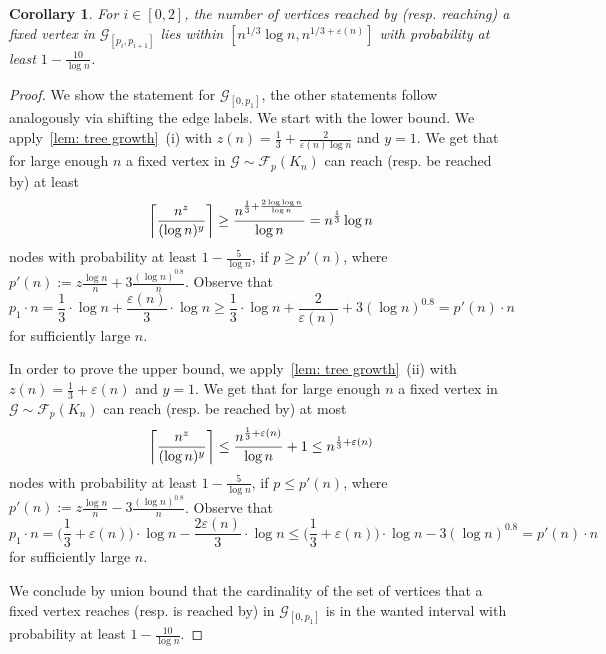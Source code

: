 \documentclass[a4paper,11pt]{article}
\theoremstyle{definition}
\theoremstyle{plain}
\newtheorem{corollary}{Corollary}
\let\eps\varepsilon
\newcommand{\FFF}{\mathcal{F}}
\newcommand{\GGG}{\mathcal{G}}
\DeclarePairedDelimiter\ceil{\lceil}{\rceil}
\begin{document}
\begin{corollary}\label{cor: reach thirds}
  For $i\in [0, 2]$, the number of vertices \emph{reached by} (resp. \emph{reaching}) a fixed vertex in
  $\GGG_{[p_i,p_{i+1}]}$ lies within $[n^{1/3}\log n, n^{1/3 + \eps(n)}]$ with probability at least $1 - \frac{10}{\log n}$.
\end{corollary}
\begin{proof}
		We show the statement for $\GGG_{[0, p_1]}$, the other statements follow analogously via shifting the edge labels.
        We start with the lower bound. We apply~\cref{lem: tree growth}~(i) with $z(n)=\frac{1}{3} + \frac{2}{\eps(n)\log n}$ and $y=1$. We get that for large enough $n$ a fixed vertex in $\GGG\sim\FFF_{p}(K_n)$ can reach (resp. be reached by) at least
        \[
            \ceil*{\frac{n^z}{(\log n)^y}}
						\ge \frac{n^{\frac{1}{3} + \frac{2\log \log n}{\log n}}}{\log n}
            = n^{\frac{1}{3}} \log n
        \]
        nodes with probability at least $1-\frac{5}{\log n}$, if $p\ge p'(n)$, where $p'(n):=z \frac{\log n}{n} + 3 \frac{(\log n)^{0.8}}{n}$. Observe that
        \[
            p_1 \cdot n
            = \frac{1}{3}\cdot \log n + \frac{\eps(n)}{3} \cdot \log n
            \ge \frac{1}{3}\cdot \log n + \frac{2}{\eps(n)} + 3(\log n)^{0.8}
						= p'(n) \cdot n
        \]
				for sufficiently large $n$.

				In order to prove the upper bound, we apply~\cref{lem: tree growth}~(ii) with $z(n)=\frac{1}{3} + \eps(n)$ and $y=1$. We get that for large enough $n$ a fixed vertex in $\GGG\sim\FFF_{p}(K_n)$ can reach (resp. be reached by) at most
        \[
            \ceil*{\frac{n^z}{(\log n)^y}}
						\le \frac{n^{\frac{1}{3} + \eps(n)}}{\log n} + 1
						\le n^{\frac{1}{3} + \eps(n)}
        \]
        nodes with probability at least $1-\frac{5}{\log n}$, if $p\le p'(n)$, where $p'(n):=z \frac{\log n}{n} - 3 \frac{(\log n)^{0.8}}{n}$. Observe that
        \[
            p_1 \cdot n
            = \Big(\frac{1}{3} + \eps(n)\Big) \cdot \log n - \frac{2\eps(n)}{3} \cdot\log n
            \le \Big(\frac{1}{3} + \eps(n)\Big)\cdot  \log n - 3(\log n)^{0.8}
						= p'(n) \cdot n
        \]
				for sufficiently large $n$.

				We conclude by union bound that the cardinality of the set of vertices that a fixed vertex reaches (resp. is reached by) in $\GGG_{[0, p_1]}$ is in the wanted interval with probability at least $1-\frac{10}{\log n}$.
\end{proof}
\end{document}
